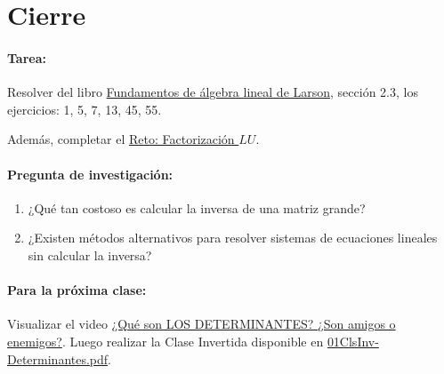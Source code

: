 \documentclass[a4,11pt]{aleph-notas}
\begin{document}
\section*{Cierre}

\paragraph{Tarea:}
Resolver del libro \href{https://catalogobiblioteca.puce.edu.ec/cgi-bin/koha/opac-detail.pl?biblionumber=86081}{Fundamentos de álgebra lineal de Larson}, sección 2.3, los ejercicios: 1, 5, 7, 13, 45, 55.

Además, completar el \href{https://fcena-puce.github.io/AlgebraLineal-05-N0048/05Proyectos-Retos/FactorizacionLU.pdf}{Reto: Factorización $LU$}.

\paragraph{Pregunta de investigación:}
\begin{enumerate}[leftmargin=*]
    \item ¿Qué tan costoso es calcular la inversa de una matriz grande? 
    \item ¿Existen métodos alternativos para resolver sistemas de ecuaciones lineales sin calcular la inversa?
\end{enumerate}

\paragraph{Para la próxima clase:}
Visualizar el video \href{https://www.youtube.com/watch?v=Bd7XboIfsU4}{¿Qué son LOS DETERMINANTES? ¿Son amigos o enemigos?}. Luego realizar la Clase Invertida disponible en \href{https://fcena-puce.github.io/AlgebraLineal-05-N0048/07Act-ClaseInvertida/01ClsInv-Determinantes.pdf}{01ClsInv-Determinantes.pdf}.
\end{document}

